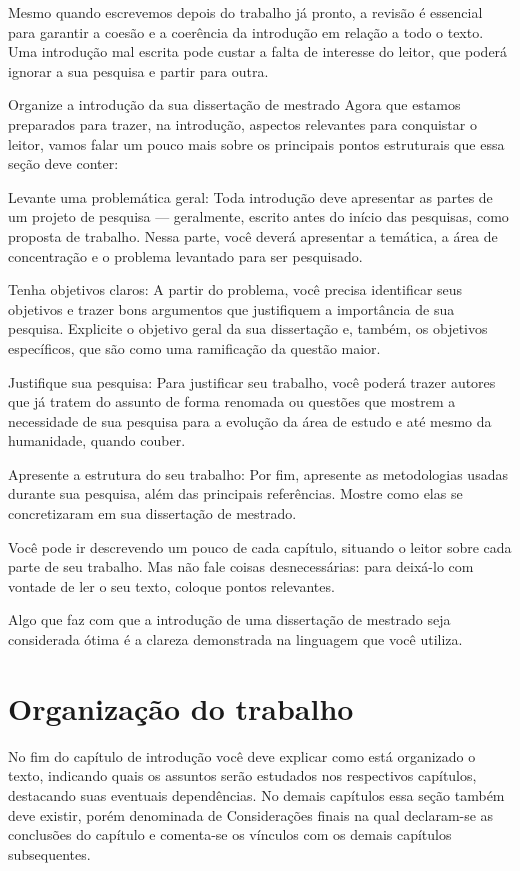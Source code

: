 Mesmo quando escrevemos depois do trabalho já pronto, a revisão é essencial para garantir a coesão e a coerência da introdução em relação a todo o texto. Uma introdução mal escrita pode custar a falta de interesse do leitor, que poderá ignorar a sua pesquisa e partir para outra.

Organize a introdução da sua dissertação de mestrado
Agora que estamos preparados para trazer, na introdução, aspectos relevantes para conquistar o leitor, vamos falar um pouco mais sobre os principais pontos estruturais que essa seção deve conter:

Levante uma problemática geral: Toda introdução deve apresentar as partes de um projeto de pesquisa — geralmente, escrito antes do início das pesquisas, como proposta de trabalho. Nessa parte, você deverá apresentar a temática, a área de concentração e o problema levantado para ser pesquisado.

Tenha objetivos claros: A partir do problema, você precisa identificar seus objetivos e trazer bons argumentos que justifiquem a importância de sua pesquisa. Explicite o objetivo geral da sua dissertação e, também, os objetivos específicos, que são como uma ramificação da questão maior.

Justifique sua pesquisa: Para justificar seu trabalho, você poderá trazer autores que já tratem do assunto de forma renomada ou questões que mostrem a necessidade de sua pesquisa para a evolução da área de estudo e até mesmo da humanidade, quando couber.

Apresente a estrutura do seu trabalho: Por fim, apresente as metodologias usadas durante sua pesquisa, além das principais referências. Mostre como elas se concretizaram em sua dissertação de mestrado.

Você pode ir descrevendo um pouco de cada capítulo, situando o leitor sobre cada parte de seu trabalho. Mas não fale coisas desnecessárias: para deixá-lo com vontade de ler o seu texto, coloque pontos relevantes.

Algo que faz com que a introdução de uma dissertação de mestrado seja considerada ótima é a clareza demonstrada na linguagem que você utiliza.

\section{Organização do trabalho}
No fim do capítulo de introdução você deve explicar como está organizado o texto, indicando quais os assuntos serão estudados nos respectivos capítulos, destacando suas eventuais dependências. No demais capítulos essa seção também deve existir, porém denominada de Considerações finais na qual declaram-se as conclusões do capítulo e comenta-se os vínculos com os demais capítulos subsequentes.
